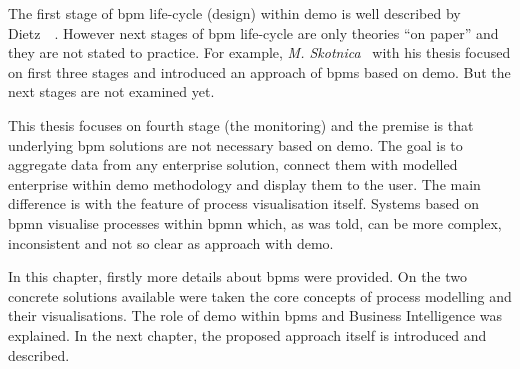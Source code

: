 The first stage of \gls{bpm} life-cycle (design) within \gls{demo} is well described by Dietz~\cite{dietz-essence-2015}~\cite{dietz-enterprise-2006}. However next stages of \gls{bpm} life-cycle are only theories ``on paper'' and they are not stated to practice. For example, \textit{M. Skotnica}~\cite{diploma-skotnica-2016} with his thesis focused on first three stages and introduced an approach of \gls{bpms} based on \gls{demo}. But the next stages are not examined yet.

This thesis focuses on fourth stage (the monitoring) and the premise is that underlying \gls{bpm} solutions are not necessary based on \gls{demo}. The goal is to aggregate data from any enterprise solution, connect them with modelled enterprise within \gls{demo} methodology and display them to the user. The main difference is with the feature of process visualisation itself. Systems based on \gls{bpmn} visualise processes within \gls{bpmn} which, as was told, can be more complex, inconsistent and not so clear as approach with \gls{demo}. 

In this chapter, firstly more details about \gls{bpms} were provided. On the two concrete solutions available were taken the core concepts of process modelling and their visualisations. The role of \gls{demo} within \gls{bpms} and Business Intelligence was explained. In the next chapter, the proposed approach itself is introduced and described.